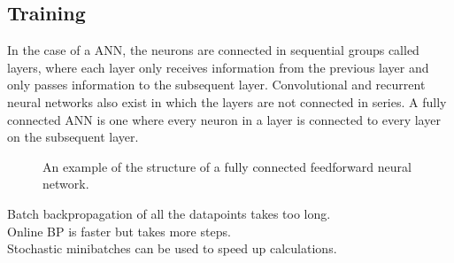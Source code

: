 \subsection{Training} \label{sec:backpropagation}

In the case of a  \ac{ANN}, the neurons are connected in sequential groups called layers, where each layer only receives information from the previous layer and only passes information to the subsequent layer.
Convolutional and recurrent neural networks also exist in which the layers are not connected in series.
A fully connected \ac{ANN} is one where every neuron in a layer is connected to every layer on the subsequent layer.

\begin{figure}[htbp]
	\centering
	
	\caption{An example of the structure of a fully connected feedforward neural network.}
	\label{fig:neural-network-example}
\end{figure}

\begin{todo}
	Batch backpropagation of all the datapoints takes too long. \\
	Online BP is faster but takes more steps. \\
	Stochastic minibatches can be used to speed up calculations. 
\end{todo}


